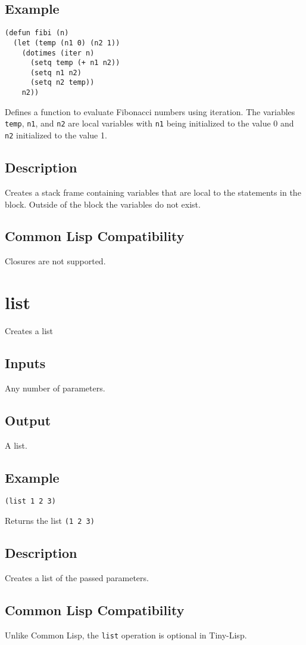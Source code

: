 \documentclass[10pt, openany]{book}
\newcommand{\keyword}[1]{\texttt{#1}}
\newcommand{\tl}{Tiny-Lisp}
\newcommand{\cl}{Common Lisp}
\begin{document}
\subsection{Example}
\begin{lstlisting}
(defun fibi (n)
  (let (temp (n1 0) (n2 1))
    (dotimes (iter n)
      (setq temp (+ n1 n2))
      (setq n1 n2)
      (setq n2 temp))
    n2))
\end{lstlisting}
Defines a function to evaluate Fibonacci numbers using iteration.  The variables \keyword{temp}, \keyword{n1}, and \keyword{n2} are local variables with \keyword{n1} being initialized to the value 0 and \keyword{n2} initialized to the value 1.
\subsection{Description}
Creates a stack frame containing variables that are local to the statements in the block.  Outside of the block the variables do not exist.
\subsection{Common Lisp Compatibility}
Closures are not supported.

\section{list}
Creates a list
\subsection{Inputs}
Any number of parameters.
\subsection{Output}
A list.
\subsection{Example}
\begin{lstlisting}
(list 1 2 3)
\end{lstlisting}
Returns the list \keyword{(1 2 3)}
\subsection{Description}
Creates a list of the passed parameters.
\subsection{Common Lisp Compatibility}
Unlike \cl{}, the \keyword{list} operation is optional in \tl{}.
\end{document}
